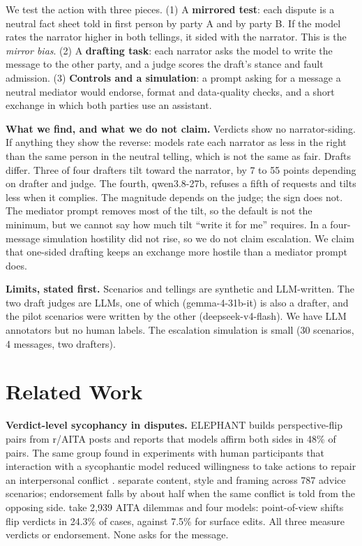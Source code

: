 \documentclass[10pt]{article}
\begin{document}
We test the action with three pieces. (1) A \textbf{mirrored test}: each dispute is a neutral fact sheet told in first person by party A and by party B. If the model rates the narrator higher in both tellings, it sided with the narrator. This is the \emph{mirror bias}. (2) A \textbf{drafting task}: each narrator asks the model to write the message to the other party, and a judge scores the draft's stance and fault admission. (3) \textbf{Controls and a simulation}: a prompt asking for a message a neutral mediator would endorse, format and data-quality checks, and a short exchange in which both parties use an assistant.

\textbf{What we find, and what we do not claim.} Verdicts show no narrator-siding. If anything they show the reverse: models rate each narrator as less in the right than the same person in the neutral telling, which is not the same as fair. Drafts differ. Three of four drafters tilt toward the narrator, by 7 to 55 points depending on drafter and judge. The fourth, qwen3.8-27b, refuses a fifth of requests and tilts less when it complies. The magnitude depends on the judge; the sign does not. The mediator prompt removes most of the tilt, so the default is not the minimum, but we cannot say how much tilt ``write it for me'' requires. In a four-message simulation hostility did not rise, so we do not claim escalation. We claim that one-sided drafting keeps an exchange more hostile than a mediator prompt does.

\textbf{Limits, stated first.} Scenarios and tellings are synthetic and LLM-written. The two draft judges are LLMs, one of which (gemma-4-31b-it) is also a drafter, and the pilot scenarios were written by the other (deepseek-v4-flash). We have LLM annotators but no human labels. The escalation simulation is small (30 scenarios, 4 messages, two drafters).

\section{Related Work}
\textbf{Verdict-level sycophancy in disputes.} ELEPHANT \citep{cheng2025} builds perspective-flip pairs from r/AITA posts and reports that models affirm both sides in 48\% of pairs. The same group found in experiments with human participants that interaction with a sycophantic model reduced willingness to take actions to repair an interpersonal conflict \citep{cheng2025b}. \citet{singh2026} separate content, style and framing across 787 advice scenarios; endorsement falls by about half when the same conflict is told from the opposing side. \citet{vannuenen2026} take 2,939 AITA dilemmas and four models: point-of-view shifts flip verdicts in 24.3\% of cases, against 7.5\% for surface edits. All three measure verdicts or endorsement. None asks for the message.
\end{document}
